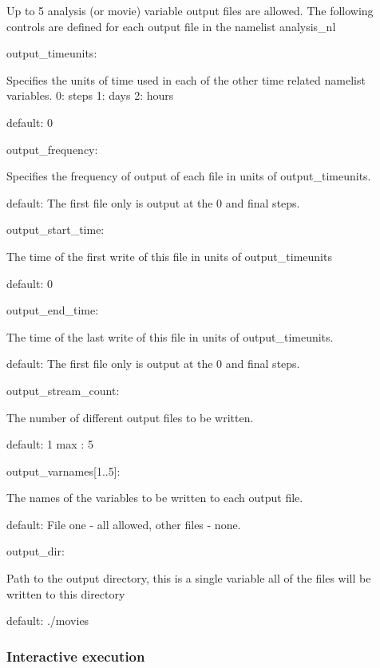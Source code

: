 \documentclass[12pt]{article}
\numberwithin{equation}{section}
\begin{document}
Up to 5 analysis (or movie) variable output files are allowed.  The
following controls are defined for each output file in the namelist
analysis\_nl
\begin{list}
{\setlength{\rightmargin}{\leftmargin}}
\item  output\_timeunits:

  Specifies the units of time used in each of the other time related namelist variables.
  0: steps
  1: days
  2: hours

  default: 0

\item output\_frequency:

  Specifies the frequency of output of each file in units of output\_timeunits.

  default: The first file only is output at the 0 and final steps.

\item output\_start\_time:
  
  The time of the first write of this file in units of output\_timeunits

  default: 0

\item output\_end\_time:

  The time of the last write of this file in units of output\_timeunits.

  default: The first file only is output at the 0 and final steps.

\item output\_stream\_count:
 
  The number of different output files to be written.

  default: 1
  max    : 5

\item output\_varnames[1..5]:

  The names of the variables to be written to each output file.  

  default: File one - all allowed, other files - none.

\item output\_dir:
  
  Path to the output directory, this is a single variable all of the files will be written
  to this directory

  default: ./movies
\end{list}

\subsubsection{Interactive execution}
\end{document}
